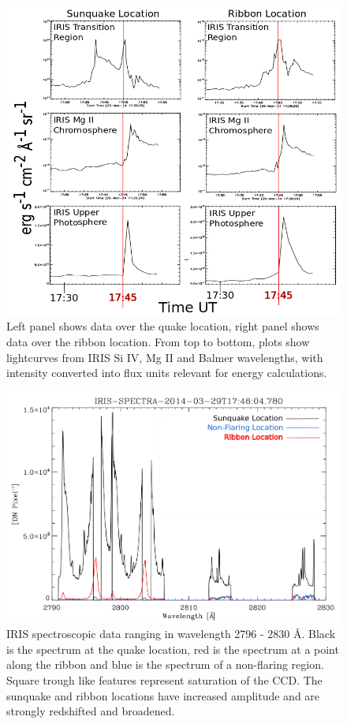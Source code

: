 \begin{figure}%
  \begin{center}
  \includegraphics[width=1.0\textwidth]{lcfluxseries}
  \end{center}
  \caption{Left panel shows data over the quake location, right panel shows data over the ribbon location. From top to bottom, plots show lightcurves from IRIS Si IV, Mg II and Balmer wavelengths, with intensity converted into flux units relevant for energy calculations.}\label{lcfluxseries}
\end{figure}

\begin{figure}%
  \begin{center}
  \includegraphics[width=1.0\textwidth]{spectra}
  \end{center}
  \caption{IRIS spectroscopic data ranging in wavelength 2796 - 2830 \AA. Black is the spectrum at the quake location, red is the spectrum at a point along the ribbon and blue is the spectrum of a non-flaring region. Square trough like features represent saturation of the CCD. The sunquake and ribbon locations have increased amplitude and are strongly redshifted and broadened.}
\end{figure}\label{spectra}
 


